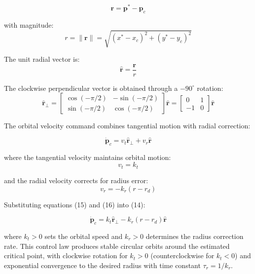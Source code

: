 \documentclass[lettersize,journal]{IEEEtran}
\begin{document}
\begin{equation}
\mathbf{r} = \mathbf{p}^* - \mathbf{p}_c
\end{equation}

with magnitude:
\begin{equation}
r = \|\mathbf{r}\| = \sqrt{(x^* - x_c)^2 + (y^* - y_c)^2}
\end{equation}

The unit radial vector is:
\begin{equation}
\hat{\mathbf{r}} = \frac{\mathbf{r}}{r}
\end{equation}

The clockwise perpendicular vector is obtained through a $-90^\circ$ rotation:
\begin{equation}
\hat{\mathbf{r}}_\perp = \begin{bmatrix} \cos(-\pi/2) & -\sin(-\pi/2) \\ \sin(-\pi/2) & \cos(-\pi/2) \end{bmatrix} \hat{\mathbf{r}} = \begin{bmatrix} 0 & 1 \\ -1 & 0 \end{bmatrix} \hat{\mathbf{r}}
\end{equation}


The orbital velocity command combines tangential motion with radial correction:

\begin{equation}
\dot{\mathbf{p}}_c = v_t \hat{\mathbf{r}}_\perp + v_r \hat{\mathbf{r}}
\end{equation}

where the tangential velocity maintains orbital motion:
\begin{equation}
v_t = k_t
\end{equation}

and the radial velocity corrects for radius error:
\begin{equation}
v_r = -k_r(r - r_d)
\end{equation}


Substituting equations (15) and (16) into (14):

\begin{equation}
\dot{\mathbf{p}}_c = k_t \hat{\mathbf{r}}_\perp - k_r(r - r_d)\hat{\mathbf{r}}
\end{equation}

where $k_t > 0$ sets the orbital speed and $k_r > 0$ determines the radius correction rate. This control law produces stable circular orbits around the estimated critical point, with clockwise rotation for $k_t > 0$ (counterclockwise for $k_t < 0$) and exponential convergence to the desired radius with time constant $\tau_r = 1/k_r$.
\end{document}
